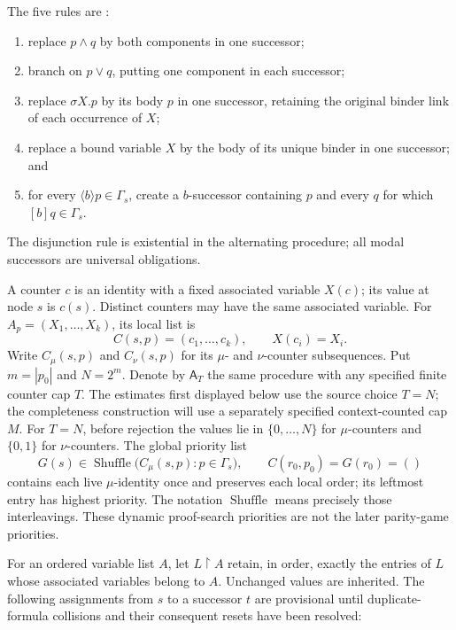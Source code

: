 The five rules are
\cite[pp.~342--343]{Kozen1983}:
\begin{enumerate}
\item replace \(p\land q\) by both components in one successor;
\item branch on \(p\lor q\), putting one component in each successor;
\item replace \(\sigma X.p\) by its body \(p\) in one successor,
      retaining the original binder link of each occurrence of \(X\);
\item replace a bound variable \(X\) by the body of its unique binder in one
      successor; and
\item for every \(\langle b\rangle p\in\Gamma_s\), create a \(b\)-successor
      containing \(p\) and every \(q\) for which
      \([b]q\in\Gamma_s\).
\end{enumerate}
The disjunction rule is existential in the alternating procedure; all modal
successors are universal obligations.

A counter \(c\) is an identity with a fixed associated variable
\(X(c)\); its value at node \(s\) is \(c(s)\).
Distinct counters may have the same associated variable.
For \(A_p=(X_1,\ldots,X_k)\), its local list is
\[
 C(s,p)=(c_1,\ldots,c_k),\qquad X(c_i)=X_i.
\]
Write \(C_\mu(s,p)\) and \(C_\nu(s,p)\) for its
\(\mu\)- and \(\nu\)-counter subsequences. Put
\(m=|p_0|\) and \(N=2^m\). Denote by \(\mathsf A_T\)
the same procedure with any specified finite counter cap \(T\).
The estimates first displayed below use the source choice \(T=N\);
the completeness construction will use a separately specified
context-counted cap \(M\).
For \(T=N\), before rejection the values lie in
\(\{0,\ldots,N\}\) for \(\mu\)-counters and
\(\{0,1\}\) for \(\nu\)-counters. The global priority list
\[
 G(s)\in\operatorname{Shuffle}
       \bigl(C_\mu(s,p):p\in\Gamma_s\bigr),\qquad
 C(r_0,p_0)=G(r_0)=()
\]
contains each live \(\mu\)-identity once and preserves each
local order; its leftmost entry has highest priority.
The notation \(\operatorname{Shuffle}\) means precisely those
interleavings. These dynamic proof-search priorities are not the
later parity-game priorities.

For an ordered variable list \(A\), let \(L\upharpoonright A\)
retain, in order, exactly the entries of \(L\) whose associated
variables belong to \(A\). Unchanged values are inherited.
The following assignments from \(s\) to a successor \(t\)
are provisional until duplicate-formula collisions and their
consequent resets have been resolved:

